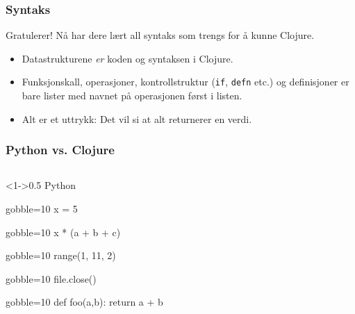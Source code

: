\documentclass{beamer}
\begin{document}
\begin{frame}
  \frametitle{Syntaks}
  Gratulerer! Nå har dere lært all syntaks som trengs for å kunne Clojure.
  \begin{itemize}
    \item<2-> Datastrukturene {\em er} koden og syntaksen i Clojure.
    \item<3-> Funksjonskall, operasjoner, kontrollstruktur ({\tt if}, {\tt defn}
      etc.) og definisjoner er bare lister med navnet på operasjonen først i
      listen.
    \item<4-> Alt er et uttrykk: Det vil si at alt returnerer en verdi.
  \end{itemize}
\end{frame}

\begin{frame}[fragile, t]
  \frametitle{Python vs. Clojure}
  \begin{columns}[T]
    \begin{column}<1->{0.5\textwidth}
      Python
      \begin{overprint} %
        \begin{pycode*}{gobble=10}
          x = 5
        \end{pycode*}
      \end{overprint}
      \begin{overprint}
        \begin{pycode*}{gobble=10}
          x * (a + b + c)
        \end{pycode*}
      \end{overprint}
      \begin{overprint} %
        \begin{pycode*}{gobble=10}
          range(1, 11, 2)
        \end{pycode*}
      \end{overprint}
      \begin{overprint}
        \begin{pycode*}{gobble=10}
          file.close()
        \end{pycode*}
      \end{overprint}
      \begin{overprint}
        \begin{pycode*}{gobble=10}
          def foo(a,b):
              return a + b
        \end{pycode*}
      \end{overprint}
    \end{column}


\end{columns}
\end{frame}
\end{document}
